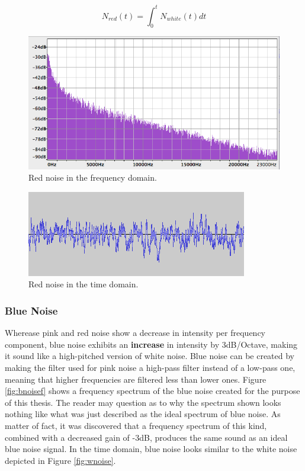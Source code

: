   \begin{equation}
    N_{red}(t) = \int_{0}^{t} N_{white}(t)dt
    \label{eq:rnoise}
  \end{equation}

  \begin{figure}[t!]
    \includegraphics[scale=0.6]{img/rnoisef}
    \caption{Red noise in the frequency domain.}
    \label{fig:rnoisef}
  \end{figure}

  \begin{figure}[t!]
    \includegraphics[scale=0.7]{img/rnoiset}
    \caption{Red noise in the time domain.}
    \label{fig:rnoiset}
  \end{figure}

  \subsubsection{Blue Noise}

  Wherease pink and red noise show a decrease in intensity per frequency component, blue noise exhibits an \textbf{increase} in intensity by 3dB/Octave, making it sound like a high-pitched version of white noise. Blue noise can be created by making the filter used for pink noise a high-pass filter instead of a low-pass one, meaning that higher frequencies are filtered less than lower ones. Figure \ref{fig:bnoisef} shows a frequency spectrum of the blue noise created for the purpose of this thesis. The reader may question as to why the spectrum shown looks nothing like what was just described as the ideal spectrum of blue noise. As matter of fact, it was discovered that a frequency spectrum of this kind, combined with a decreased gain of -3dB, produces the same sound as an ideal blue noise signal. In the time domain, blue noise looks similar to the white noise depicted in Figure \ref{fig:wnoise}.

